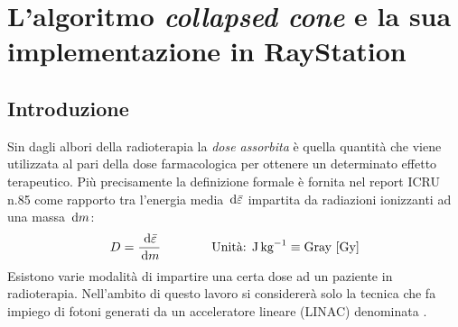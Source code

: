 \chapter{L'algoritmo \emph{collapsed cone} e la sua implementazione in RayStation}
\setcounter{minitocdepth}{1}
\minitoc
\setcounter{minitocdepth}{2}

\section{Introduzione}
Sin dagli albori della radioterapia la \textit{dose assorbita} è quella quantità che viene utilizzata al pari della dose farmacologica per ottenere un determinato effetto terapeutico. Più precisamente la definizione formale è fornita nel report ICRU n.85 \cite{ICRU85} come rapporto tra l'energia media $\,\text{d} \bar{\varepsilon}$ impartita da radiazioni ionizzanti ad una massa $\,\text{d} m$:
\begin{equation}
D = \frac{\,\text{d} \bar{\varepsilon}}{\,\text{d} m} \qquad\qquad \text{Unità: J\,kg}^{-1} \equiv \text{Gray [Gy]}
\end{equation} 
Esistono varie modalità di impartire una certa dose ad un paziente in radioterapia. Nell'ambito di questo lavoro si considererà solo la tecnica che fa impiego di fotoni generati da un acceleratore lineare (LINAC) denominata .

